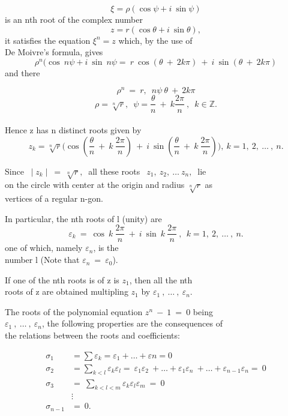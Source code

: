 \documentclass[11pt]{amsbook}
\begin{document}




\[
    \xi = \rho(\cos\psi+ i\: \sin\psi)
\]
is an nth root of the complex number
\[
    z = r (\cos\theta + i\: \sin\theta),
\]
it satisfies the equation \:\:  $\xi^n = z$  \:\: which, by the use of
\\De Moivre's formula, gives 
\[
    \rho^n(\cos\:n\psi+i\:\sin\:n\psi=\:r\:\cos(\theta\:+\:2k\pi)\:+\:i\:\sin(\theta\:+\:2k\pi)   
\]
and there

\[
    \rho^n\:=\:r,\enspace  n\psi\:\theta\:+\:2k\pi
\]
\[
    \rho=\sqrt[n]{r},\enspace \psi = \frac{\theta}{n} \:+\:k\frac{2\pi}{n}\:,\enspace k\in  \mathbb{Z}.
\]
\\Hence z has n distinct roots given by
\[
    z_{k} = \sqrt[n]{r} \Big( \cos(\frac{\theta}{n} \:+\:k\:\frac{2\pi}{n})\:+\:i\:\sin(\frac{\theta}{n} \:+\:k\:\frac{2\pi}{n}) \Big) , \:k=1,\:2,\:\dots \: ,\:n.
\]

    Since $\: \mid z_{k} \mid \:=\:\sqrt[n]{r},\:$ all these roots $\:\:z_{1},\:z_{2},\:\dots\:z_{n},\:$ lie
\\on the circle with center at the origin and radius  $\sqrt[n]{r}$  as \\vertices of a regular n-gon.

In particular, the nth roots of l (unity) are 
\[
    \varepsilon_{k} \: = \: \cos\:k\:\frac{2\pi}{n} \:+\:i\:\sin\: k\:\frac{2\pi}{n} \:,\: \:k=1,\:2,\:\dots \: ,\:n.
\]
one of which, namely $\varepsilon_{n}$,  is the
\\number l (Note that  $\varepsilon_{n}\:=\:\varepsilon_{0}$).

If one of the nth roots is of z is $z_{1}$, then all the nth 
\\roots of z are obtained multipling $z_{1}$ by $\varepsilon_{1}\:,\:\dots\:,\:\varepsilon_{n}.$

The roots of the polynomial equation $z^n\:-\:1\:=\:0$ being
\\$\varepsilon_{1}\:,\:\dots\:,\:\varepsilon_{n}$, the following properties are the consequences of
\\the relations between the roots and coefficients:


\begin{align*}
    \sigma_{1} 
        &= \sum \varepsilon_{k}
         = \varepsilon_{1} + \dots +\varepsilon{n}
         =0\\
    \sigma_{2} 
        &= \sum_{k<l}\varepsilon_{k}\varepsilon_{l}
         =\:\varepsilon_{1}\varepsilon_{2}\:+\dots+\varepsilon_{1}\varepsilon_{n}\:+\dots+\varepsilon_{n-1}\varepsilon_{n}
         =\:0\\
    \sigma_{3} 
        &=\:\sum_{k<l<m}\varepsilon_{k}\varepsilon_{l}\varepsilon_{m}\:
         =\:0\\
    &\vdots\\
    \sigma_{n-1}
        &=\:0.
\end{align*}

\end{document}
